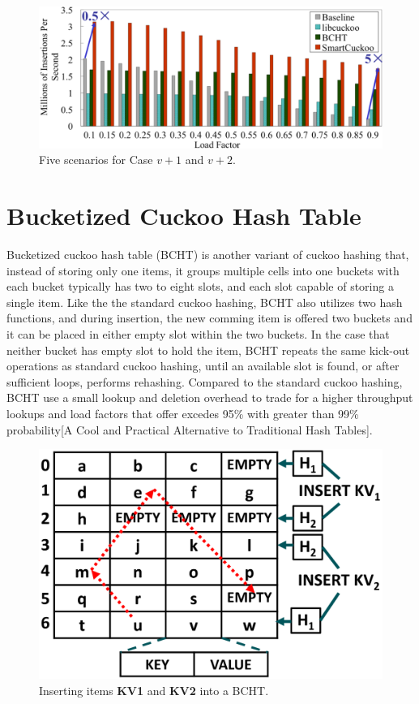 \documentclass[12pt,conference,compsoc]{IEEEtran}
\begin{document}
\begin{figure}
    \centering
    \includegraphics[width=\linewidth]{performance.png}
    \caption{Five scenarios for Case $v+1$ and $v+2$.} \label{fig:performance}
\end{figure}

\section{Bucketized Cuckoo Hash Table}
\label{sec:BCHT}
Bucketized cuckoo hash table (BCHT) is another variant of cuckoo hashing that, instead of storing only one items, it groups multiple cells into one buckets with each bucket typically has two to eight slots, and each slot capable of storing a single item. Like the the standard cuckoo hashing, BCHT also utilizes two hash functions, and during insertion, the new comming item is offered two buckets and it can be placed in either empty slot within the two buckets. In the case that neither bucket has empty slot to hold the item, BCHT repeats the same kick-out operations as standard cuckoo hashing, until an available slot is found, or after sufficient loops, performs rehashing. Compared to the standard cuckoo hashing, BCHT use a small lookup and deletion overhead to trade for a  higher throughput lookups and load factors that offer excedes 95\% with greater than 99\% probability[A Cool and Practical Alternative to Traditional Hash Tables].

\begin{figure}
    \centering
    \includegraphics[width=\linewidth]{BCHT.png}
    \caption{Inserting items \textbf{KV1} and \textbf{KV2} into a BCHT.} \label{fig:BCHT}
\end{figure}
\end{document}
